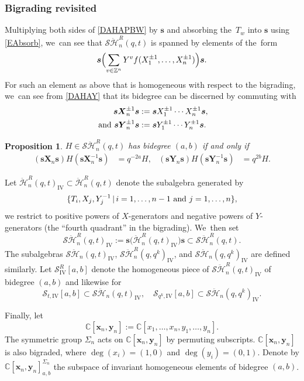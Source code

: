 \documentclass[JEP,XML,SOM,Unicode,published]{cedram}
\newtheorem{prop}[thm]{Proposition}
\theoremstyle{definition}
\newcommand{\ZZ}{\mathbb{Z}}
\newcommand{\CC}{\mathbb{C}}
\newcommand{\SHH}{\mathcal{S}\ddot{\mathcal{H}}}
\newcommand{\HH}{\ddot{\mathcal{H}}}
\newcommand{\ee}{\boldsymbol{s}}
\begin{document}
\subsubsection{Bigrading revisited}\label{DAHABigrad}
Multiplying both sides of \eqref{DAHAPBW} by $\ee$ and absorbing the~$T_w$ into $\ee$ using \eqref{EAbsorb}, we~can see that $\SHH_n^R(q,t)$ is spanned by elements of the~form
\[
\ee \Bigl(\sum_{v\in\ZZ^n}Y^vf(X_1^{\pm 1},\ldots, X_n^{\pm 1})\Bigr)\ee.
\]
For such an element as above that is homogeneous with respect to the bigrading, we~can see from \eqref{DAHAY} that its bidegree can be discerned by commuting with
\begin{equation}
\begin{aligned}
\ee\boldsymbol{X}_n^{\pm1}\ee&:=\ee X_1^{\pm 1}\cdots X_n^{\pm 1}\ee,\\
\hbox{ and }\ee\boldsymbol{Y}_n^{\pm 1}\ee&:=\ee Y_1^{\pm 1}\cdots Y_n^{\pm 1}\ee.
\end{aligned}
\label{DAHADet}
\end{equation}
\begin{prop}
$H\in\SHH_n^R(q,t)$ has bidegree $(a,b)$ if and only if
\begin{align*}
\left(\ee \boldsymbol{X}_n\ee\right) H \left(\ee \boldsymbol{X}_n^{-1}\ee\right)&= q^{-2a}H,&
\left(\ee \boldsymbol{Y}_n\ee\right) H \left(\ee \boldsymbol{Y}_n^{-1}\ee\right)&= q^{2b}H.
\end{align*}
\end{prop}

Let $\HH_n^R(q,t)_{\textrm{IV}}\subset\HH_n^R(q,t)$ denote the subalgebra generated by
\[
\{T_i, X_j, Y^{-1}_j\, |\, i=1,\ldots, n-1\hbox{ and }j=1,\ldots, n\},
\]
\ie we restrict to positive powers of $X$-generators and negative powers of $Y$-generators (the ``fourth quadrant'' in the bigrading). We~then set
\[
\SHH_n^R(q,t)_{\textrm{IV}}:=\ee\bigl(\HH_n^R(q,t)_{\textrm{IV}}\bigr)\ee\subset\SHH_n^R(q,t).
\]
The subalgebras $\SHH_n(q,t)_{\mathrm{IV}}$, $\SHH_n^R(q,q^k)_{\mathrm{IV}}$, and $\SHH_n(q,q^k)_{\mathrm{IV}}$ are defined similarly.
Let $\mathcal{S}^R_{\mathrm{IV}}[a,b]$ denote the homogeneous piece of $\SHH_n^R(q,t)_{\mathrm{IV}}$ of bidegree $(a,b)$ and likewise for
\[
\mathcal{S}_{t,\mathrm{IV}}[a,b]\subset\SHH_n(q,t)_{\mathrm{IV}},\quad
\mathcal{S}_{q^k,\mathrm{IV}}[a,b]\subset\SHH_n(q,q^k)_{\mathrm{IV}}.
\]

Finally, let
\[
\CC[\boldsymbol{x}_n,\boldsymbol{y}_n]:=\CC[x_1,\ldots, x_n, y_1,\ldots, y_n].
\]
The symmetric group $\Sigma_n$ acts on $\CC[\boldsymbol{x}_n,\boldsymbol{y}_n]$ by permuting subscripts.
$\CC[\boldsymbol{x}_n,\boldsymbol{y}_n]$ is also bigraded, where $\deg(x_i)=(1,0)$ and $\deg(y_i)=(0,1)$.
Denote by $\CC[\boldsymbol{x}_n,\boldsymbol{y}_n]^{\Sigma_n}_{a,b}$ the subspace of invariant homogeneous elements of bidegree $(a,b)$.
\end{document}
